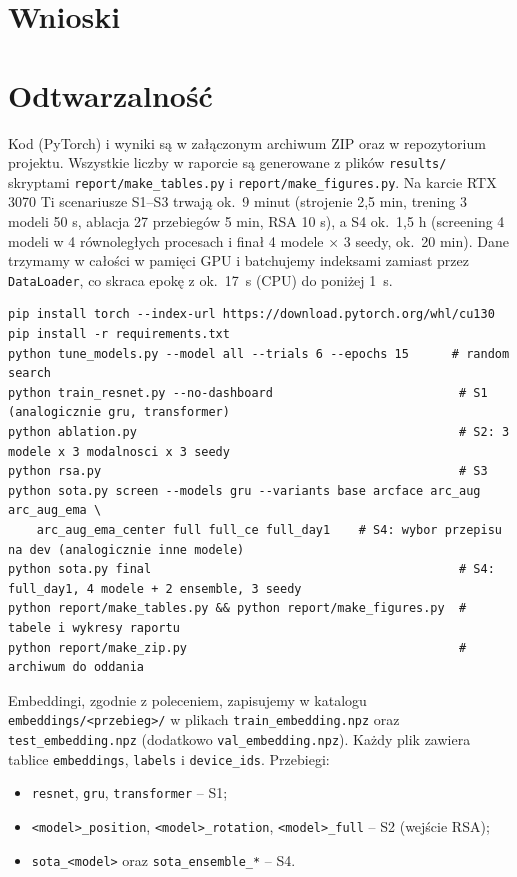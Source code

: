 \documentclass[11pt,a4paper]{article}
\newcommand{\code}[1]{\texttt{#1}}
\begin{document}
\section{Wnioski}\label{sec:wnioski}


\section{Odtwarzalność}\label{sec:odtwarzalnosc}
Kod (PyTorch) i wyniki są w załączonym archiwum ZIP oraz w repozytorium projektu. Wszystkie liczby
w raporcie są generowane z plików \code{results/} skryptami \code{report/make\_tables.py} i
\code{report/make\_figures.py}. Na karcie RTX 3070 Ti scenariusze S1--S3 trwają ok.~9 minut
(strojenie 2{,}5 min, trening 3 modeli 50 s, ablacja 27 przebiegów 5 min, RSA 10 s), a S4 ok.~1{,}5 h
(screening 4 modeli w 4 równoległych procesach i finał 4 modele $\times$ 3 seedy, ok.~20 min). Dane trzymamy w całości w pamięci GPU i batchujemy indeksami zamiast przez
\code{DataLoader}, co skraca epokę z ok.~17~s (CPU) do poniżej 1~s.

\begin{lstlisting}
pip install torch --index-url https://download.pytorch.org/whl/cu130
pip install -r requirements.txt
python tune_models.py --model all --trials 6 --epochs 15      # random search
python train_resnet.py --no-dashboard                          # S1 (analogicznie gru, transformer)
python ablation.py                                             # S2: 3 modele x 3 modalnosci x 3 seedy
python rsa.py                                                  # S3
python sota.py screen --models gru --variants base arcface arc_aug arc_aug_ema \
    arc_aug_ema_center full full_ce full_day1    # S4: wybor przepisu na dev (analogicznie inne modele)
python sota.py final                                           # S4: full_day1, 4 modele + 2 ensemble, 3 seedy
python report/make_tables.py && python report/make_figures.py  # tabele i wykresy raportu
python report/make_zip.py                                      # archiwum do oddania
\end{lstlisting}

Embeddingi, zgodnie z poleceniem, zapisujemy w katalogu \code{embeddings/<przebieg>/} w plikach
\code{train\_embedding.npz} oraz \code{test\_embedding.npz} (dodatkowo \code{val\_embedding.npz}). Każdy plik zawiera tablice \code{embeddings}, \code{labels} i
\code{device\_ids}. Przebiegi:
\begin{itemize}
  \item \code{resnet}, \code{gru}, \code{transformer} -- S1;
  \item \code{<model>\_position}, \code{<model>\_rotation}, \code{<model>\_full} -- S2 (wejście RSA);
  \item \code{sota\_<model>} oraz \code{sota\_ensemble\_*} -- S4.
\end{itemize}
\end{document}
